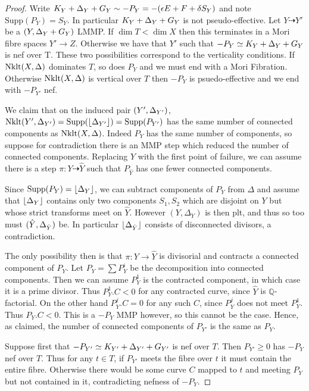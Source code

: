 \begin{proof}
	Write $K_{Y}+\Delta_{Y}+G_{Y}\sim - P_{Y}=-(\epsilon E + F + \delta S_{Y})$ and note $\text{Supp}(P_{Y})=S_{Y}$. In particular $K_{Y}+\Delta_{Y}+G_{Y}$ is not pseudo-effective. Let $Y \dashrightarrow Y'$ be a $(Y,\Delta_{Y}+G_{Y})$ LMMP. If $\dim T < \dim X$ then this terminates in a Mori fibre spaces $Y' \to Z$. Otherwise we have that $Y'$ such that $-P_{Y}\simeq K_{Y}+\Delta_{Y}+G_{Y}$ is nef over T. These two possibilities correspond to the verticality conditions. If $\textup{Nklt}(X,\Delta)$ dominates $T$, so does $P_{Y}$ and we must end with a Mori Fibration. Otherwise $\textup{Nklt}(X,\Delta)$ is vertical over $T$ then $-P_{Y}$ is psuedo-effective and we end with $-P_{Y'}$ nef.
	
	We claim that on the induced pair $(Y',\Delta_{Y'})$, $\textup{Nklt}(Y',\Delta_{Y'})=\text{Supp}(\lfloor \Delta_{Y'} \rfloor)=\text{Supp}(P_{Y'})$ has the same number of connected components as $\textup{Nklt}(X,\Delta)$. Indeed $P_{Y}$ has the same number of components, so suppose for contradiction there is an MMP step which reduced the number of connected components. Replacing $Y$ with the first point of failure, we can assume there is a step $\pi: Y \dashrightarrow \hat{Y}$ such that $P_{\hat{Y}}$ has one fewer connected components. 
	
	Since $\text{Supp}(P_{Y})=\lfloor \Delta_{Y} \rfloor$, we can subtract components of $P_{Y}$ from $\Delta$ and assume that $\lfloor \Delta_{Y} \rfloor$ contains only two components $S_{1}, S_{2}$ which are disjoint on $Y$ but whose strict transforms meet on $\hat{Y}$. However $(Y,\Delta_{Y})$ is then plt, and thus so too must $(\hat{Y},\Delta_{\hat{Y}})$ be. In particular $\lfloor \Delta_{\hat{Y}} \rfloor$ consists of disconnected divisors, a contradiction. 
	
	The only possibility then is that $\pi: Y \to \hat{Y}$ is divisorial and contracts a connected component of $P_{Y}$. Let $P_{Y}=\sum P_{Y}^{i}$ be the decomposition into connected components. Then we can assume $P_{Y}^{1}$ is the contracted component, in which case it is a prime divisor. Thus $P_{Y}^{1}.C <0$ for any contracted curve, since $\hat{Y}$ is $\mathbb{Q}$-factorial. On the other hand $P_{Y}^{j}.C=0$ for any such $C$, since $P_{Y}^{j}$ does not meet $P_{Y}^{1}$. Thus $P_{Y}.C <0$. This is a $-P_{Y}$ MMP however, so this cannot be the case. Hence, as claimed, the number of connected components of $P_{Y'}$ is the same as $P_{Y}$.
	
	Suppose first that $-P_{Y'} \simeq K_{Y'}+\Delta_{Y'}+G_{Y'}$ is nef over $T$. Then $P_{Y'} \geq 0$ has $-P_{Y}$ nef over $T$. Thus for any $t \in T$, if $P_{Y'}$ meets the fibre over $t$ it must contain the entire fibre. Otherwise there would be some curve $C$ mapped to $t$ and meeting $P_{Y}$ but not contained in it, contradicting nefness of $-P_{Y}$.
	

\end{proof}
